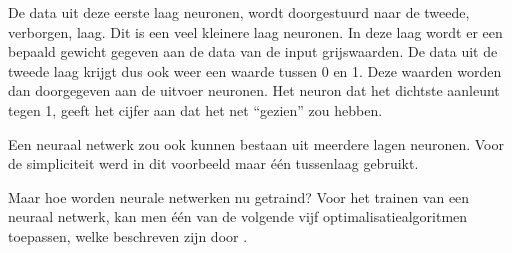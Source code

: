 De data uit deze eerste laag neuronen, wordt doorgestuurd naar de tweede, verborgen, laag. Dit is een veel kleinere laag neuronen. In deze laag wordt er een bepaald gewicht gegeven aan de data van de input grijswaarden. De data uit de tweede laag krijgt dus ook weer een waarde tussen 0 en 1. Deze waarden worden dan doorgegeven aan de uitvoer neuronen. Het neuron dat het dichtste aanleunt tegen 1, geeft het cijfer aan dat het net “gezien” zou hebben. 

Een neuraal netwerk zou ook kunnen bestaan uit meerdere lagen neuronen. Voor de simpliciteit werd in dit voorbeeld maar één tussenlaag gebruikt.

Maar hoe worden neurale netwerken nu getraind? Voor het trainen van een neuraal netwerk, kan men één van de volgende vijf optimalisatiealgoritmen toepassen, welke beschreven zijn door \textcite{neuraldesigners}.

